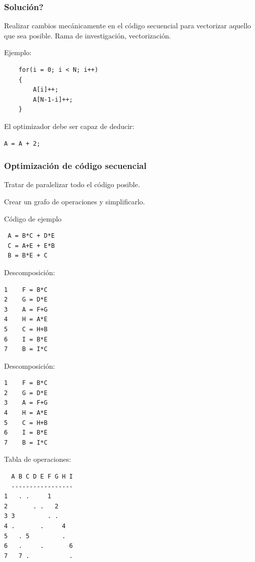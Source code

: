 \documentclass{beamer}
\begin{document}
\begin{frame}[fragile]
\frametitle{Solución?}

Realizar cambios mecánicamente en el código secuencial para vectorizar aquello
que sea posible. Rama de investigación, vectorización.

Ejemplo:

\begin{lstlisting}
    for(i = 0; i < N; i++)
    {
        A[i]++;
        A[N-1-i]++;
    }
\end{lstlisting}

El optimizador debe ser capaz de deducir:

\begin{lstlisting}
A = A + 2;
\end{lstlisting}

\end{frame}



\begin{frame}
\frametitle{Optimización de código secuencial}
Tratar de paralelizar todo el código posible.

Crear un grafo de operaciones y simplificarlo.
\end{frame}



\begin{frame}[fragile]
Código de ejemplo

\begin{lstlisting}
 A = B*C + D*E
 C = A+E + E*B
 B = B*E + C
\end{lstlisting}

Descomposición:

\begin{lstlisting}
1    F = B*C
2    G = D*E
3    A = F+G
4    H = A*E
5    C = H+B
6    I = B*E
7    B = I*C
\end{lstlisting}

\end{frame}



\begin{frame}[fragile]
Descomposición:
\begin{lstlisting}
1    F = B*C
2    G = D*E
3    A = F+G
4    H = A*E
5    C = H+B
6    I = B*E
7    B = I*C
\end{lstlisting}
Tabla de operaciones:
\begin{lstlisting}
  A B C D E F G H I
  -----------------
1   . .     1      
2       . .   2        
3 3         . .        
4 .       .     4     
5   . 5         .
6   .     .       6
7   7 .           .
\end{lstlisting}
\end{frame}
\end{document}
